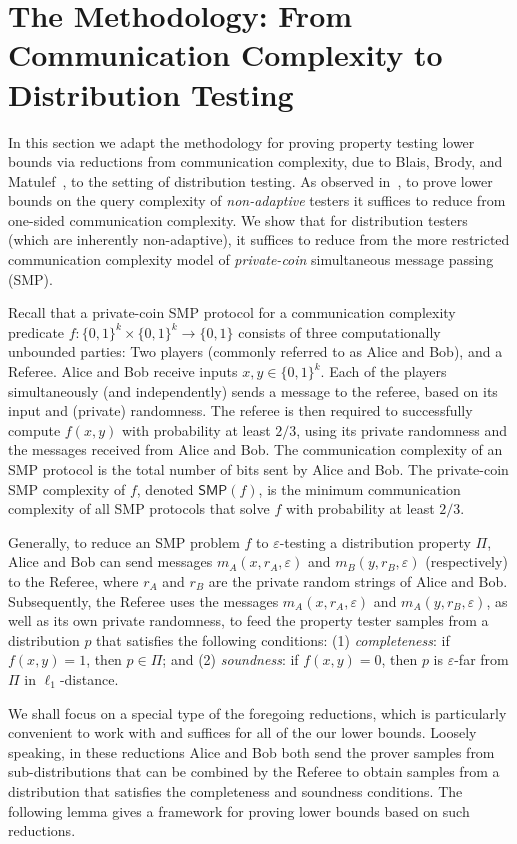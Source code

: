 \documentclass[11pt]{article}
\theoremstyle{remark}   	\newtheorem{remark}[theorem]{Remark}
\theoremstyle{definition}   	\newaliascnt{defn}{theorem}
\newcommand{\eps}{\ensuremath{\varepsilon}\xspace}
\newcommand{\bitset}{\ensuremath{\{0,1\}}}
\newcommand{\SMP}{\ensuremath{\mathsf{SMP}}}
\begin{document}
\section{The Methodology: From Communication Complexity to Distribution Testing}\label{sec:methodology}
In this section we adapt the methodology for proving property testing lower bounds via reductions from communication complexity, due to Blais, Brody, and Matulef~\cite{BBM12}, to the setting of distribution testing.  As observed in~\cite{BBM12,BMW:11}, to prove lower bounds on the query complexity of \emph{non-adaptive} testers it suffices to reduce from one-sided communication complexity. We show that for distribution testers (which are inherently non-adaptive), it suffices to reduce from the more restricted communication complexity model of \emph{private-coin} simultaneous message passing (SMP).

Recall that a private-coin SMP protocol for a communication complexity predicate $f\colon \bitset^k \times \bitset^k \to \bitset$ consists of three computationally unbounded  parties: Two players (commonly referred to as Alice and Bob), and a Referee. Alice and Bob receive inputs $x,y \in \bitset^k$. Each of the players simultaneously (and independently) sends a message to the referee, based on its input and (private) randomness. The referee is then required to successfully compute $f(x,y)$ with probability at least $2/3$, using its private randomness and the messages received from Alice and Bob. The communication complexity of an SMP protocol is the total number of bits sent by Alice and Bob. The private-coin SMP complexity of $f$, denoted $\SMP(f)$, is the minimum communication complexity of all SMP protocols that solve $f$ with probability at least $2/3$.

Generally, to reduce an SMP problem $f$ to $\eps$-testing a distribution property $\Pi$, Alice and Bob can send  messages $m_A(x,r_A,\eps)$ and $m_B(y,r_B,\eps)$ (respectively) to the Referee, where $r_A$ and $r_B$ are the private random strings of Alice and Bob. Subsequently, the Referee uses the messages $m_A(x,r_A,\eps)$ and $m_A(y,r_B,\eps)$, as well as its own private randomness, to feed the property tester samples from a distribution $p$ that satisfies the following conditions: (1) \emph{completeness}: if $f(x,y)=1$, then $p\in \Pi$; and (2) \emph{soundness}: if $f(x,y)=0$, then $p$ is $\eps$-far from $\Pi$ in $\ell_1$-distance.

We shall focus on a special type of the foregoing reductions, which is particularly convenient to work with and suffices for all of the our lower bounds. Loosely speaking, in these reductions Alice and Bob both send the prover samples from sub-distributions that can be combined by the Referee to obtain samples from a distribution that satisfies the completeness and soundness conditions. The following lemma gives a framework for proving lower bounds based on such reductions.
\end{document}

